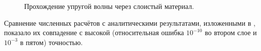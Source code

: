 \begin{figure}
\begin{minipage}[h]{0.47\linewidth}
 \\
\end{minipage}
\hfill
\begin{minipage}[h]{0.47\linewidth}
 \\
\end{minipage}
\caption{Прохождение упругой волны через слоистый материал.}
\label{pic:mnogosloika}
\end{figure}

Сравнение численных расчётов с аналитическими результатами, изложенными в \cite{petrov_tormasov_holodov}, показало их совпадение с высокой (относительная ошибка $10^{-10}$ во втором слое и $10^{-3}$ в пятом) точностью.

